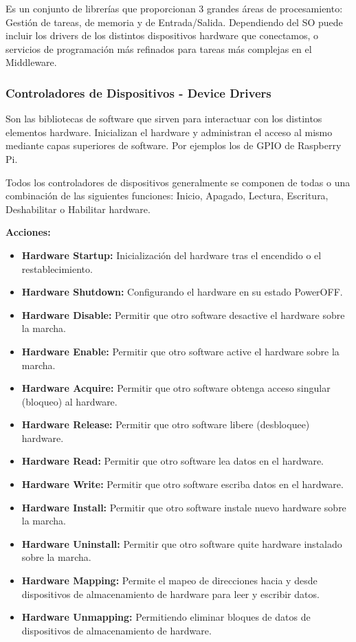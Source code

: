 \documentclass[12pt]{report} %
\begin{document}
Es un conjunto de librerías que proporcionan 3 grandes áreas de procesamiento: Gestión de tareas, de memoria y de Entrada/Salida. Dependiendo del SO puede incluir los drivers de los distintos dispositivos hardware que conectamos, o servicios de programación más refinados para tareas más complejas en el Middleware.

\subsubsection{Controladores de Dispositivos - Device Drivers}
Son las bibliotecas de software que sirven para interactuar con los distintos elementos hardware. Inicializan el hardware y administran el acceso al mismo mediante capas superiores de software. Por ejemplos los de GPIO de Raspberry Pi.

Todos los controladores de dispositivos generalmente se componen de todas o una combinación de las siguientes funciones: Inicio, Apagado, Lectura, Escritura, Deshabilitar o Habilitar hardware.

\textbf{Acciones:}
\begin{itemize}
	\item \textbf{Hardware Startup:} Inicialización del hardware tras el encendido o el restablecimiento.
	\item \textbf{Hardware Shutdown:} Configurando el hardware en su estado PowerOFF.
	\item \textbf{Hardware Disable:} Permitir que otro software desactive el hardware sobre la marcha.
	\item \textbf{Hardware Enable:} Permitir que otro software active el hardware sobre la marcha.
	\item \textbf{Hardware Acquire:} Permitir que otro software obtenga acceso singular (bloqueo) al hardware.
	\item \textbf{Hardware Release:} Permitir que otro software libere (desbloquee) hardware. 
	\item \textbf{Hardware Read:} Permitir que otro software lea datos en el hardware.
	\item \textbf{Hardware Write:} Permitir que otro software escriba datos en el hardware.
	\item \textbf{Hardware Install:} Permitir que otro software instale nuevo hardware sobre la marcha.  
	\item \textbf{Hardware Uninstall:} Permitir que otro software quite hardware instalado sobre la marcha.   
	\item \textbf{Hardware Mapping:} Permite el mapeo de direcciones hacia y desde dispositivos de almacenamiento de hardware para leer y escribir datos.
	\item \textbf{Hardware Unmapping:} Permitiendo eliminar bloques de datos de dispositivos de almacenamiento de hardware.
\end{itemize}
\end{document}
